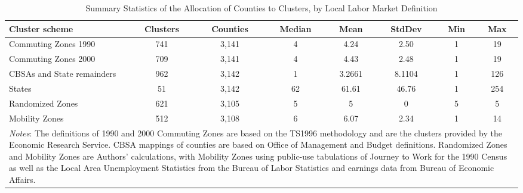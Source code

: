 \begin{table}\centering
\caption{Summary Statistics of the Allocation of Counties to Clusters, by Local Labor Market Definition\label{tab:clustersum}}
\begin{tabular}{lccccccc}
\hline\hline
Cluster scheme & Clusters & Counties & Median & Mean & StdDev & Min & Max \\ 
\hline
Commuting Zones 1990 & 741 & 3,141 & 4 & 4.24 & 2.50 & 1 & 19 \\ 
Commuting Zones 2000 & 709 & 3,141 & 4 & 4.43 & 2.48 & 1 & 19 \\ 
CBSAs and State remainders & 962 &    3,142 &  1 & 3.2661 &  8.1104 &   1 &    126 \\ 
States & 51 & 3,142 & 62 & 61.61 & 46.76 & 1 & 254 \\ 
Randomized Zones & 621 & 3,105 & 5 & 5 & 0 & 5 & 5 \\ 
Mobility Zones & 512 & 3,108 & 6 & 6.07 & 2.34 & 1 & 14 \\ 
\hline
\multicolumn{8}{p{6.5in}}{\footnotesize \textit{Notes}: The definitions of 1990 and 2000 Commuting Zones are based on the TS1996 methodology and are the clusters provided by the Economic Research Service. CBSA mappings of counties are based on Office of Management and Budget definitions. Randomized Zones and Mobility Zones are Authors' calculations, with Mobility Zones using public-use tabulations of Journey to Work for the 1990 Census as well as the Local Area Unemployment Statistics from the Bureau of Labor Statistics and earnings data from Bureau of Economic Affairs.}\\
\end{tabular}
\end{table}

